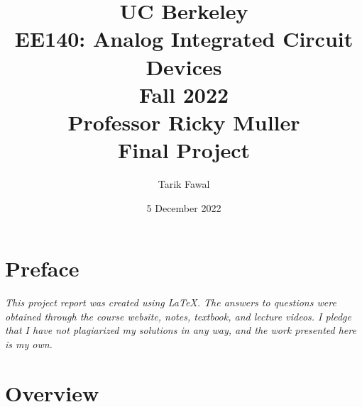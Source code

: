 \documentclass[12pt, fleqn]{article}
\title {
    \normalsize{UC Berkeley}\\
    \large{{EE140: Analog Integrated Circuit Devices\\Fall 2022\\Professor Ricky Muller\\}}
    \vspace{0.5ex}
    \Huge{Final Project}
    \vspace{0.5ex}
}
\author{Tarik Fawal}
\date{5 December 2022}
\begin{document}
\maketitle
\tableofcontents
\flushbottom
    \section*{Preface}
        \textit{\emph{This project report was created using \LaTeX.  The answers to questions were obtained through the course website, notes, textbook, and lecture videos.  I pledge that I have not plagiarized my solutions in any way, and the work presented here is my own.}}
\newpage
\section{Overview}
\end{document}

